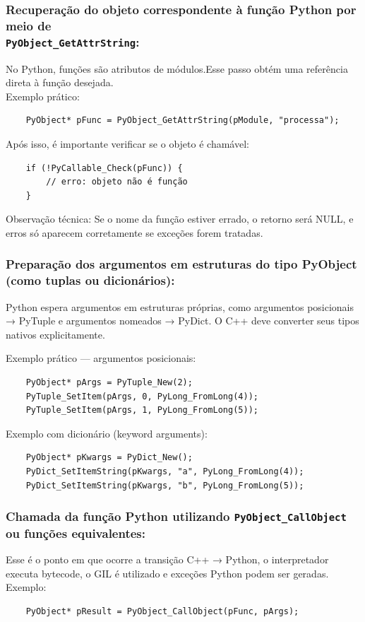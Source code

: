     \subsubsection{Recuperação do objeto correspondente à função Python por meio de\\ \texttt{PyObject\_GetAttrString}:}
    No Python, funções são atributos de módulos.Esse passo obtém uma referência direta à função desejada. \\
Exemplo prático:
\begin{verbatim}
    PyObject* pFunc = PyObject_GetAttrString(pModule, "processa");
\end{verbatim} 

Após isso, é importante verificar se o objeto é chamável:
\begin{verbatim}
    if (!PyCallable_Check(pFunc)) {
        // erro: objeto não é função
    }
\end{verbatim} 
Observação técnica: Se o nome da função estiver errado, o retorno será NULL, e erros  só aparecem corretamente se exceções forem tratadas.

    \subsubsection{ Preparação dos argumentos em estruturas do tipo PyObject\\ (como tuplas ou dicionários):}
    Python espera argumentos em estruturas próprias, como argumentos posicionais → PyTuple
e argumentos nomeados → PyDict. O C++ deve converter seus tipos nativos explicitamente.

Exemplo prático — argumentos posicionais:
\begin{verbatim}
    PyObject* pArgs = PyTuple_New(2);
    PyTuple_SetItem(pArgs, 0, PyLong_FromLong(4));
    PyTuple_SetItem(pArgs, 1, PyLong_FromLong(5));
\end{verbatim} 
Exemplo com dicionário (keyword arguments):
\begin{verbatim}
    PyObject* pKwargs = PyDict_New();
    PyDict_SetItemString(pKwargs, "a", PyLong_FromLong(4));
    PyDict_SetItemString(pKwargs, "b", PyLong_FromLong(5));
\end{verbatim}

    \subsubsection{ Chamada da função Python utilizando \texttt{PyObject\_CallObject} ou funções equivalentes:}
Esse é o ponto em que ocorre a transição C++ → Python, o interpretador executa bytecode, o GIL é utilizado e exceções Python podem ser geradas.\\
Exemplo:
\begin{verbatim}
    PyObject* pResult = PyObject_CallObject(pFunc, pArgs);
\end{verbatim}

